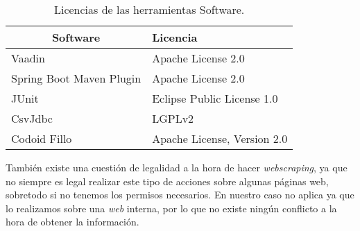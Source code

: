\begin{table}[]
	\label{Dependencias del proyecto}
	\centering
	\begin{tabular}{|l|l|}
		\hline
		\multicolumn{1}{|c|}{\textbf{Software}}     & \textbf{Licencia} \\ \hline
		Vaadin & Apache License 2.0 \\ \hline
		Spring Boot Maven Plugin & Apache License 2.0 \\ \hline
		JUnit & Eclipse Public License 1.0 \\	\hline
		CsvJdbc & LGPLv2 \\ \hline
		Codoid Fillo & Apache License, Version 2.0 \\ \hline
	\end{tabular}
	\caption{Licencias de las herramientas Software.}
\end{table}

También existe una cuestión de legalidad a la hora de hacer \emph{webscraping}, ya que no siempre es legal realizar este tipo de acciones sobre algunas páginas web, sobretodo si no tenemos los permisos necesarios. En nuestro caso no aplica ya que lo realizamos sobre una \emph{web} interna, por lo que no existe ningún conflicto a la hora de obtener la información.

